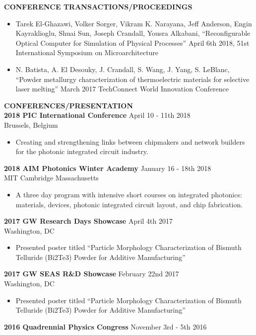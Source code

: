 \begin{singlespace}
\textbf{CONFERENCE TRANSACTIONS/PROCEEDINGS}
\begin{itemize}
	\item Tarek El-Ghazawi, Volker Sorger, Vikram K. Narayana, Jeff Anderson, Engin Kayraklioglu, Shuai Sun, Joseph Crandall, Yousra Alkabani, “Reconfigurable Optical Computer for Simulation of Physical Processes” April 6th 2018, 51st International Symposium on Microarchitecture 
	\item N. Batista, A. El Desouky, J. Crandall, S. Wang, J. Yang, S. LeBlanc, “Powder metallurgy characterization of thermoelectric materials for selective laser melting” March 2017 TechConnect World Innovation Conference
\end{itemize}

\textbf{CONFERENCES/PRESENTATION}\\
\textbf{2018 PIC International Conference} \hfill April 10 - 11th 2018\\
Brussels, Belgium
\begin{itemize}
	\item Creating and strengthening links between chipmakers and network builders for the photonic integrated circuit industry. 	
\end{itemize}
\textbf{2018 AIM Photonics Winter Academy} \hfill January 16 - 18th 2018\\
MIT Cambridge Massachusetts
\begin{itemize}
	\item A three day program with intensive short courses on integrated photonics: materials, devices, photonic integrated circuit layout, and chip fabrication. 
\end{itemize}
\textbf{2017 GW Research Days Showcase} \hfill April 4th 2017\\
Washington, DC
\begin{itemize}
	\item Presented poster titled “Particle Morphology Characterization of Bismuth Telluride (Bi2Te3) Powder for Additive Manufacturing”
\end{itemize}
\textbf{2017 GW SEAS R\&D Showcase} \hfill February 22nd 2017\\
Washington, DC
\begin{itemize}
	\item Presented poster titled “Particle Morphology Characterization of Bismuth Telluride (Bi2Te3) Powder for Additive Manufacturing”
\end{itemize}
\textbf{2016 Quadrennial Physics Congress} \hfill November 3rd - 5th  2016\\

\end{singlespace}
